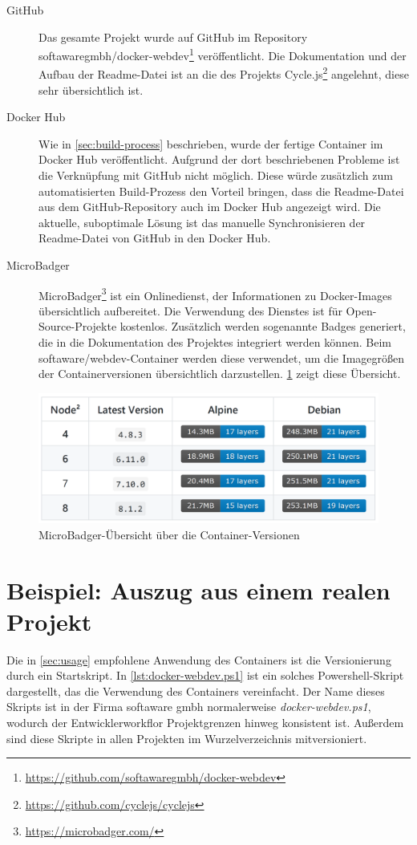 \begin{description}
    \item[GitHub] Das gesamte Projekt wurde auf GitHub im Repository softawaregmbh/docker-webdev\footnote{\url{https://github.com/softawaregmbh/docker-webdev}} veröffentlicht.
        Die Dokumentation und der Aufbau der Readme-Datei ist an die des Projekts Cycle.js\footnote{\url{https://github.com/cyclejs/cyclejs}} angelehnt, diese sehr übersichtlich ist.
    \item[Docker Hub] Wie in \cref{sec:build-process} beschrieben, wurde der fertige Container im Docker Hub veröffentlicht.
        Aufgrund der dort beschriebenen Probleme ist die Verknüpfung mit GitHub nicht möglich.
        Diese würde zusätzlich zum automatisierten Build-Prozess den Vorteil bringen, dass die Readme-Datei aus dem GitHub-Repository auch im Docker Hub angezeigt wird.
        Die aktuelle, suboptimale Lösung ist das manuelle Synchronisieren der Readme-Datei von GitHub in den Docker Hub.
    \item[MicroBadger] MicroBadger\footnote{\url{https://microbadger.com/}} ist ein Onlinedienst, der Informationen zu Docker-Images übersichtlich aufbereitet.
        Die Verwendung des Dienstes ist für Open-Source-Projekte kostenlos.
        Zusätzlich werden sogenannte Badges generiert, die in die Dokumentation des Projektes integriert werden können.
        Beim softaware/webdev-Container werden diese verwendet, um die Imagegrößen der Containerversionen übersichtlich darzustellen.
        \cref{fig:microbdager-versions} zeigt diese Übersicht.
\end{description}

\begin{figure}[htbp]
    \centering
    \includegraphics[width=0.75\linewidth,clip]{images/container-versions}
    \caption{MicroBadger-Übersicht über die Container-Versionen}
\label{fig:microbdager-versions}
\end{figure}


\section{Beispiel: Auszug aus einem realen Projekt}
\label{sec:example}
Die in \cref{sec:usage} empfohlene Anwendung des Containers ist die Versionierung durch ein Startskript.
In \cref{lst:docker-webdev.ps1} ist ein solches Powershell-Skript dargestellt, das die Verwendung des Containers vereinfacht.
Der Name dieses Skripts ist in der Firma softaware gmbh normalerweise \emph{docker-webdev.ps1}, wodurch der Entwicklerworkflor Projektgrenzen hinweg konsistent ist.
Außerdem sind diese Skripte in allen Projekten im Wurzelverzeichnis mitversioniert.

